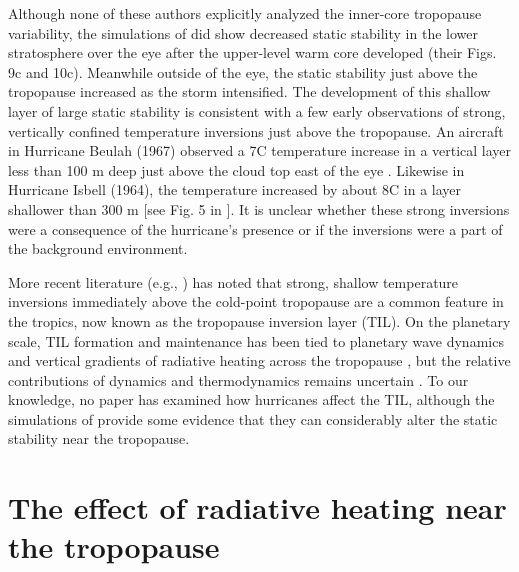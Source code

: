 Although none of these authors explicitly analyzed the inner-core tropopause variability, the simulations of \cite{OhnoSatoh2015} did show decreased static stability in the lower stratosphere over the eye after the upper-level warm core developed (their Figs. 9c and 10c).
Meanwhile outside of the eye, the static stability just above the tropopause increased as the storm intensified.
The development of this shallow layer of large static stability is consistent with a few early observations of strong, vertically confined temperature inversions just above the tropopause.
An aircraft in Hurricane Beulah (1967) observed a 7\textdegree{}C temperature increase in a vertical layer less than 100 m deep just above the cloud top east of the eye \citep{Waco1970}.
Likewise in Hurricane Isbell (1964), the temperature increased by about 8\textdegree{}C in a layer shallower than 300 m [see Fig. 5 in \cite{Gentry1967}].
It is unclear whether these strong inversions were a consequence of the hurricane’s presence or if the inversions were a part of the background environment.

More recent literature (e.g., \cite{Wirth2003}) has noted that strong, shallow temperature inversions immediately above the cold-point tropopause are a common feature in the tropics, now known as the tropopause inversion layer (TIL).
On the planetary scale, TIL formation and maintenance has been tied to planetary wave dynamics \cite{Griseetal2010} and vertical gradients of radiative heating across the tropopause \citep{Randeletal2007}, but the relative contributions of dynamics and thermodynamics remains uncertain \citep{Ferreiraetal2016}.
To our knowledge, no paper has examined how hurricanes affect the TIL, although the simulations of \cite{OhnoSatoh2015} provide some evidence that they can considerably alter the static stability near the tropopause.

\section{The effect of radiative heating near the tropopause}

